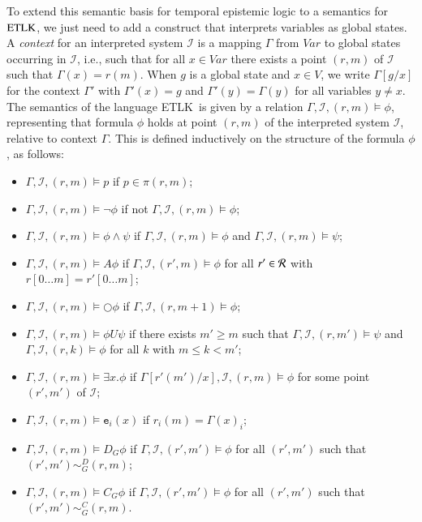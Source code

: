 \documentclass[a4wide]{article}
\newcommand{\R}{{\cal R}}
\newcommand{\until}{U}
\newcommand{\SVar}{V\!ar}
\theoremstyle{examplesty}
\newcommand{\I}{\mathcal{I}}
\newcommand{\existsg}[1]{\exists #1.}
\newcommand{\lid}[2]{\mathtt{e}_{#1}(#2)}
\newcommand{\Var}{V}
\newcommand{\nxt}{\Circle}
\newcommand{\Cont}{\Gamma}
\newcommand{\ETL}{{\rm ETLK}}
\begin{document}
To extend this semantic basis for temporal epistemic logic to a semantics for 
$\ETL$, 
we just need
to add a construct that interprets variables as global states. 
A {\em context} for an interpreted system $\I$  is a mapping $\Cont$ from $\SVar$ to global states occurring in $\I$, 
i.e., such that for all $x\in \SVar$ there exists a point $(r,m)$ of $\I$ such that $\Cont(x) = r(m)$. 
When $g$ is a global state and $x\in \Var$, 
we write $\Cont[g/x]$ for the context $\Cont'$ with $\Cont'(x) =g$ and $\Cont'(y) = \Cont(y)$ for all variables $y\neq x$. 
The semantics of the language \ETL\  
is given by a relation $\Cont, \I, (r,m) \models \phi$, representing that 
formula $\phi$ holds at point $(r,m)$ of the interpreted system $\I$, relative to context $\Cont$. 
This is defined inductively on the structure of the formula $\phi$, as follows: 
\begin{itemize}
\item $\Cont, \I, (r,m)\models p$ if   $p\in \pi(r,m)$; 
\item
$\Cont, \I, (r,m)\models \neg \phi$ if not $\Cont, \I, (r,m)\models \phi$; 

\item
$\Cont, \I, (r,m)\models \phi\wedge \psi$ if $\Cont, \I, (r,m)\models \phi$ and $\Cont, \I, (r,m)\models \psi$; 

\item
$\Cont, \I, (r,m)\models A\phi$ if  $\Cont, \I, (r',m)\models \phi$ for all $r' \in \R$ with 
$r[0\ldots m] = r'[0\ldots m]$; 

\item
$\Cont, \I, (r,m)\models \nxt\phi$ if  $\Cont, \I,  (r,m+1)\models \phi$; 

\item
$\Cont, \I, (r,m)\models \phi \until \psi$ if  there exists
$m'\!\geq\! m $ such that $\Cont, \I, (r,m')\models \psi$ and  $\Cont, \I, (r,k)\models \phi$ for all $k$ with $m\leq k < m'$;


\item
$\Cont, \I, (r,m)\models \existsg{x}\phi$ if $\Cont[r'(m')/x], \I, (r,m)\models\phi$ for some point $(r',m')$ of $\I$; 

\item
$\Cont,\I, (r,m)\models \lid{i}{x}$ if $r_i(m) = \Cont(x)_i$; 


\item
$\Cont,\I, (r,m)\models D_G\phi$ if 
 $\Cont,\I, (r',m')\models \phi$ for all $(r',m')$ such that 
 $(r',m')\sim^D_G (r,m)$;
 

\item
$\Cont,\I, (r,m)\models C_G\phi$ if 
$\Cont,\I,(r',m')\models\phi$ for all $(r',m')$ such that $(r',m')\sim_G^C (r,m)$.
\end{itemize}
\end{document}

